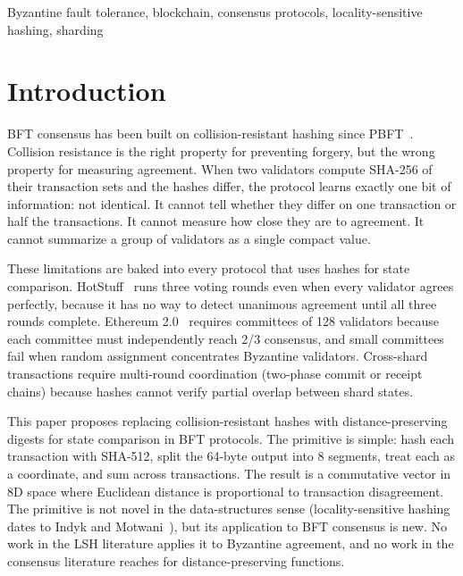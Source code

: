 \documentclass[conference]{IEEEtran}
\begin{document}
\begin{IEEEkeywords}
Byzantine fault tolerance, blockchain, consensus protocols, locality-sensitive hashing, sharding
\end{IEEEkeywords}

\section{Introduction}

BFT consensus has been built on collision-resistant hashing since PBFT~\cite{castro1999pbft}. Collision resistance is the right property for preventing forgery, but the wrong property for measuring agreement. When two validators compute SHA-256 of their transaction sets and the hashes differ, the protocol learns exactly one bit of information: not identical. It cannot tell whether they differ on one transaction or half the transactions. It cannot measure how close they are to agreement. It cannot summarize a group of validators as a single compact value.

These limitations are baked into every protocol that uses hashes for state comparison. HotStuff~\cite{yin2019hotstuff} runs three voting rounds even when every validator agrees perfectly, because it has no way to detect unanimous agreement until all three rounds complete. Ethereum 2.0~\cite{eth2spec} requires committees of 128 validators because each committee must independently reach 2/3 consensus, and small committees fail when random assignment concentrates Byzantine validators. Cross-shard transactions require multi-round coordination (two-phase commit or receipt chains) because hashes cannot verify partial overlap between shard states.

This paper proposes replacing collision-resistant hashes with distance-preserving digests for state comparison in BFT protocols. The primitive is simple: hash each transaction with SHA-512, split the 64-byte output into 8 segments, treat each as a coordinate, and sum across transactions. The result is a commutative vector in 8D space where Euclidean distance is proportional to transaction disagreement. The primitive is not novel in the data-structures sense (locality-sensitive hashing dates to Indyk and Motwani~\cite{indyk1998lsh}), but its application to BFT consensus is new. No work in the LSH literature applies it to Byzantine agreement, and no work in the consensus literature reaches for distance-preserving functions.
\end{document}

